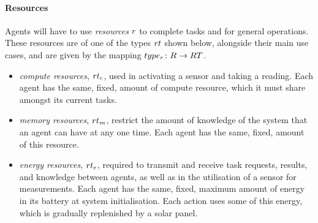 
\paragraph{Resources}
\label{section:overview:resources}

\newcommand{\varResourceType}[2]{\varSymbol{RT}{#1}{#2}}
\newcommand{\setResourceType}[2]{\setSymbol{RT}{#1}{#2}}
\newcommand{\varResourceTypeCompute}[2]{\varResourceType{c}{#2}}
\newcommand{\varResourceTypeEnergy}[2]{\varResourceType{e}{#2}}
\newcommand{\varResourceTypeMemory}[2]{\varResourceType{m}{#2}}
\newcommand{\varResourceCompute}[2]{\varResource{c}{#2}}
\newcommand{\varResourceEnergy}[2]{\varResource{e}{#2}}
\newcommand{\varResourceMemory}[2]{\varResource{m}{#2}}

\newcommand{\formalResourceType}[2]{
	\functionFormal{type_r}
	{\setResource{}{}}
	{\setResourceType{}{}}
}
\newcommand{\functionResourceType}[2]{
	\functionSignature{type_r}
	{\varResource{}{}}}
Agents will have to use \textit{resources} $\varResource{}{}$ to complete tasks and for general operations. These resources are of one of the types $\varResourceType{}{}$ shown below, alongside their main use cases, and are given by the mapping $\formalResourceType{}{}$.

\begin{itemize}
	\item \textit{compute resources}, $\varResourceTypeCompute{}{}$,  used in activating a sensor and taking a reading. Each agent has the same, fixed, amount of compute resource, which it must share amongst its current tasks.
	
	\item \textit{memory resources}, $\varResourceTypeMemory{}{}$,  restrict the amount of knowledge of the system that an agent can have at any one time. Each agent has the same, fixed, amount of this resource.

	\item \textit{energy resources}, $\varResourceTypeEnergy{}{}$,  required to transmit and receive task requests, results, and knowledge between agents, as well as in the utilisation of a sensor for measurements. Each agent has the same, fixed, maximum amount of energy in its battery at system initialisation. Each action uses some of this energy, which is gradually replenished by a solar panel.
\end{itemize}

